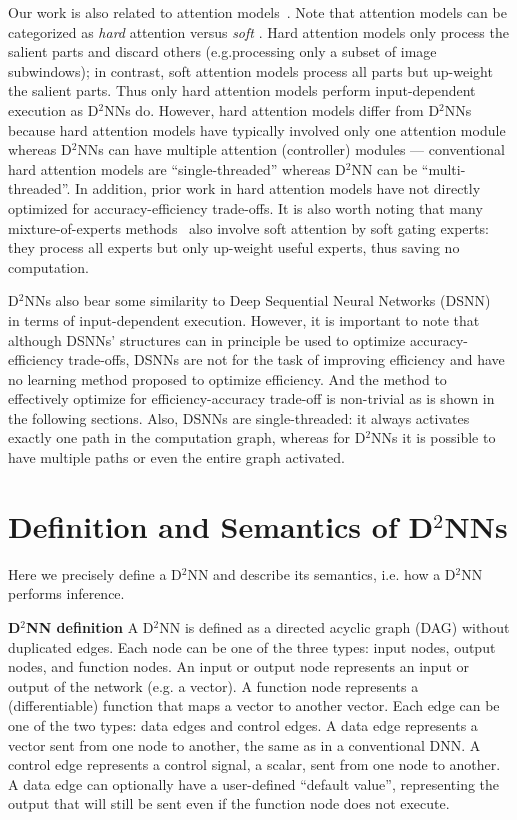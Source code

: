 \documentclass[10pt,twocolumn,letterpaper]{article}
\newcommand{\smallparagraph}[1]{\smallskip \noindent \textbf{#1}}
\begin{document}
Our work is also related to attention
models~\cite{denil2012learning,mnih2014recurrent,gregor2015draw}.
Note that attention
models can be categorized as \emph{hard} attention \cite{mnih2014recurrent,ba2014multiple,DBLP:conf/icml/AlmahairiBCZLC16} 
  versus \emph{soft} \cite{gregor2015draw,stollenga2014deep}. Hard
attention models only process the salient parts and discard others 
(e.g.\@ processing only a subset of image subwindows); in contrast, soft
attention models process all parts but up-weight the salient parts. 
Thus only hard
attention models perform input-dependent execution as D$^2$NNs do. 
However, hard attention models differ from D$^2$NNs because hard attention models have typically
involved only one attention module  whereas D$^2$NNs can have multiple attention
(controller) modules --- conventional hard attention models are ``single-threaded'' whereas
D$^2$NN can be ``multi-threaded''. In addition, prior work
in hard attention models have not directly optimized for accuracy-efficiency
trade-offs.
It is also worth noting that many mixture-of-experts methods~\cite{jacobs1991adaptive,jordan1994hierarchical,eigen2013learning} also involve soft attention by soft gating experts: they process all experts but only up-weight useful experts, thus saving no computation. 

D$^2$NNs also bear some similarity to Deep Sequential Neural
Networks (DSNN)~\cite{denoyer2014deep} in terms of input-dependent execution. 
However, it is important to note that although DSNNs' structures can in principle be used to optimize accuracy-efficiency trade-offs, 
DSNNs are not for the task of improving efficiency and have no learning method proposed to optimize efficiency. And the method to effectively optimize for efficiency-accuracy trade-off is non-trivial as is  shown in the following sections.
Also, DSNNs are single-threaded: it always activates exactly one path in the computation graph, whereas for D$^2$NNs it is
possible to have multiple paths or even the entire graph activated. 

\section{Definition and Semantics of D$^2$NNs}

Here we precisely define a D$^2$NN and describe its semantics, i.e.\@
how a D$^2$NN performs inference. 


\smallparagraph{D$^2$NN definition} 
A D$^2$NN is defined as a directed acyclic graph (DAG) without duplicated edges. Each node can be one of the
three types: input nodes, output nodes, and function nodes. An input or output
node represents an input or output of the network (e.g. a vector). A function node
represents a (differentiable) function
that maps a vector to another vector. Each edge can be one of the two types: data edges and control
edges. A data edge represents a vector sent from one node to another, the same as in a
conventional DNN. A control edge represents a control signal, a scalar, sent from
one node to another. A data edge can optionally
have a user-defined ``default value'', representing the output that will still be sent even
if the function node does not execute.
\end{document}
